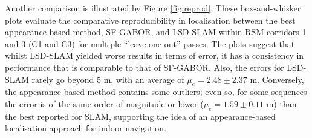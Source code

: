Another comparison is illustrated by Figure \ref{fig:reprod}. These box-and-whisker plots evaluate the comparative reproducibility in localisation between the best appearance-based method, SF-GABOR, and LSD-SLAM within RSM corridors 1 and 3 (C1 and C3) for multiple ``leave-one-out'' passes. The plots suggest that whilst LSD-SLAM yielded worse results in terms of error, it has a consistency in performance that is comparable to that of SF-GABOR. Also, the errors for LSD-SLAM rarely go beyond $5$ m, with an average of $\mu_e = 2.48 \pm 2.37$ m. Conversely, the appearance-based method contains some outliers; even so, for some sequences the error is of the same order of magnitude or lower ($\mu_e = 1.59 \pm 0.11$ m) than the best reported for SLAM, supporting the idea of an appearance-based localisation approach for indoor navigation. 

